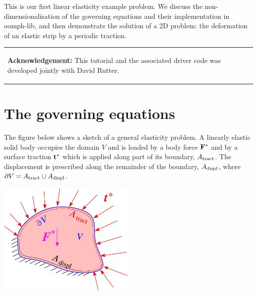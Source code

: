 This is our first linear elasticity example problem. We discuss the non-\/dimensionalisation of the governing equations and their implementation in {\ttfamily oomph-\/lib}, and then demonstrate the solution of a 2D problem\+: the deformation of an elastic strip by a periodic traction.

\begin{center} \tabulinesep=1mm
\begin{longtabu} spread 0pt [c]{*{1}{|X[-1]}|}
\hline
\begin{center} {\bfseries Acknowledgement\+:} This tutorial and the associated driver code was developed jointly with David Rutter. \end{center}    \\
\end{longtabu}
\end{center} 



 

\hypertarget{index_equation}{}\section{The governing equations}\label{index_equation}
The figure below shows a sketch of a general elasticity problem. A linearly elastic solid body occupies the domain $ V $ and is loaded by a body force $ {\bf F}^* $ and by a surface traction $ {\bf t}^* $ which is applied along part of its boundary, $ A_{\rm tract} $. The displacement is prescribed along the remainder of the boundary, $ A_{\rm displ} $, where $ \partial V = A_{\rm tract} \cup A_{\rm displ} $.

 
\begin{DoxyImage}
\includegraphics[width=0.5\textwidth]{Solid_boundary_conds}
\end{DoxyImage}


